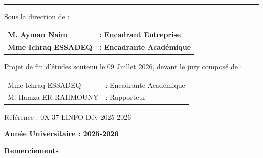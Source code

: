 \documentclass[12pt, a4paper]{report}
\begin{document}
\begin{titlepage}
  \vspace{0.1cm}
  \noindent\rule{\textwidth}{0.6pt}

  \vspace{0.3cm}

  \begin{flushleft}
    {\normalsize Sous la direction de :}

    \vspace{0.2cm}

    \begin{tabular}{ll}
      \textbf{M. Ayman Naim {\hspace{4cm}}} & \textbf{: Encadrant Entreprise} \\[0.3cm]
      \textbf{Mme Ichraq ESSADEQ\hspace{1cm}} & \textbf{: Encadrante Académique} \\
    \end{tabular}

    \vspace{0.8cm}

    {\normalsize Projet de fin d'études soutenu le \textcolor{mundiablue}{09 Juillet} 2026,
    devant le jury composé de :}

    \vspace{0.4cm}

    \begin{tabular}{ll}
      Mme Ichraq ESSADEQ\hspace{1cm}  & : Encadrante Académique \\[0.1cm]
      M. Hamza ER-RAHMOUNY\hspace{1cm} & : Rapporteur \\
    \end{tabular}

    \vspace{0.4cm}

    {\normalsize Référence : 0X-37-LINFO-Dév-2025-2026}
  \end{flushleft}

  \vfill

  {\large\bfseries\textcolor{mundiablue}{Année Universitaire : 2025-2026}}

\end{titlepage}

\clearpage
\thispagestyle{empty}
\setcounter{page}{2}

\begin{center}
  {\sffamily\large\bfseries Remerciements}
\end{center}
\end{document}

